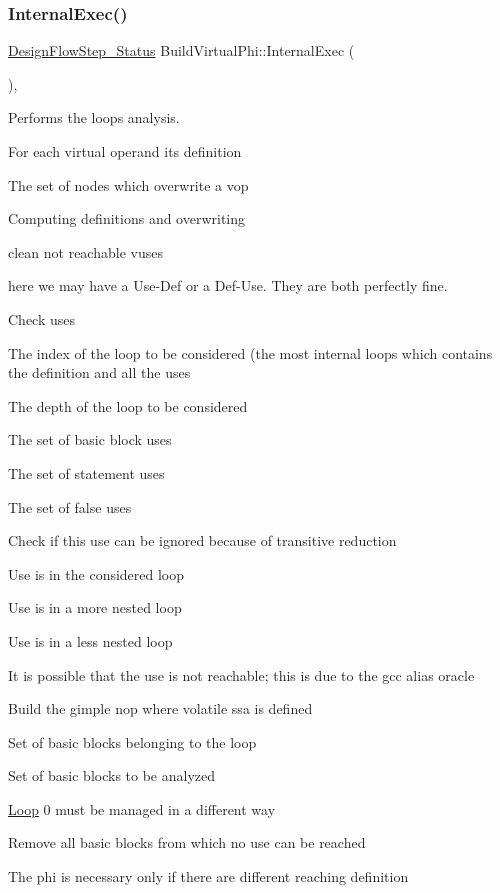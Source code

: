 \subsubsection{\texorpdfstring{Internal\+Exec()}{InternalExec()}}
{\footnotesize\ttfamily \hyperlink{design__flow__step_8hpp_afb1f0d73069c26076b8d31dbc8ebecdf}{Design\+Flow\+Step\+\_\+\+Status} Build\+Virtual\+Phi\+::\+Internal\+Exec (\begin{DoxyParamCaption}{ }\end{DoxyParamCaption})\hspace{0.3cm}{\ttfamily [override]}, {\ttfamily [virtual]}}



Performs the loops analysis. 

For each virtual operand its definition

The set of nodes which overwrite a vop

Computing definitions and overwriting

clean not reachable vuses

here we may have a Use-\/\+Def or a Def-\/\+Use. They are both perfectly fine.

Check uses

The index of the loop to be considered (the most internal loops which contains the definition and all the uses

The depth of the loop to be considered

The set of basic block uses

The set of statement uses

The set of false uses

Check if this use can be ignored because of transitive reduction

Use is in the considered loop

Use is in a more nested loop

Use is in a less nested loop

It is possible that the use is not reachable; this is due to the gcc alias oracle

Build the gimple nop where volatile ssa is defined

Set of basic blocks belonging to the loop

Set of basic blocks to be analyzed

\hyperlink{classLoop}{Loop} 0 must be managed in a different way

Remove all basic blocks from which no use can be reached

The phi is necessary only if there are different reaching definition

